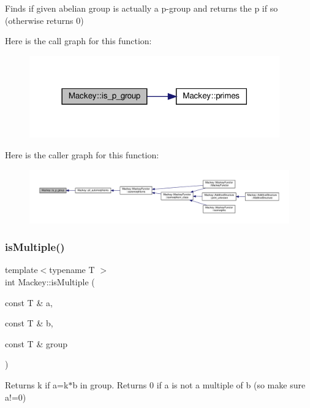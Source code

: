 Finds if given abelian group is actually a p-\/group and returns the p if so (otherwise returns 0) 

Here is the call graph for this function\+:\nopagebreak
\begin{figure}[H]
\begin{center}
\leavevmode
\includegraphics[width=306pt]{namespaceMackey_a2b6ac22efe0be546f2c3f8abc2ceb5b7_cgraph}
\end{center}
\end{figure}
Here is the caller graph for this function\+:\nopagebreak
\begin{figure}[H]
\begin{center}
\leavevmode
\includegraphics[width=350pt]{namespaceMackey_a2b6ac22efe0be546f2c3f8abc2ceb5b7_icgraph}
\end{center}
\end{figure}
\mbox{\label{namespaceMackey_af70b0c547f7121b8815885dfebde67d9}} 
\subsubsection{\texorpdfstring{is\+Multiple()}{isMultiple()}}
{\footnotesize\ttfamily template$<$typename T $>$ \\
int Mackey\+::is\+Multiple (\begin{DoxyParamCaption}\item[{const T \&}]{a,  }\item[{const T \&}]{b,  }\item[{const T \&}]{group }\end{DoxyParamCaption})}



Returns k if a=k$\ast$b in group. Returns 0 if a is not a multiple of b (so make sure a!=0) 

